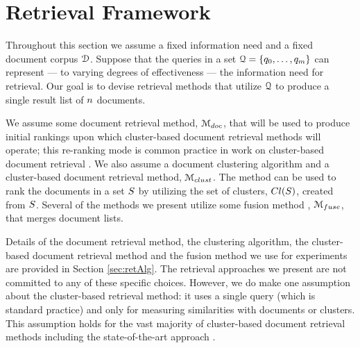 \section{Retrieval Framework}
Throughout this section we assume a fixed information need and a fixed document corpus ${\mathcal D}$. Suppose that the queries in a set 
${\mathcal Q}=\{q_0,\ldots,q_{m}\}$ can represent --- to varying degrees of effectiveness
--- the information need for retrieval. Our goal is to devise retrieval methods that
utilize ${\mathcal Q}$ to produce a single result list of $n$ documents. 

We assume some document retrieval
method, ${\mathcal M_{doc}}$, that will be used to produce initial rankings
upon which cluster-based document retrieval methods will operate; this re-ranking mode is common practice in work on cluster-based document retrieval 
\cite{Kurland+Lee:06a,Liu+Croft:06a,Liu+Croft:06b,Liu+Croft:08a,kurland:08a,Kurland+Krikon:11a,Raiber+Kurland:13a}. We also assume a document clustering algorithm and a cluster-based
  document retrieval method, $\mathcal M_{clust}$. The method can be used
  to rank the documents in a set $S$ by utilizing
  the set of clusters, $Cl(S)$, created from
  $S$. Several of the methods we present utilize some
  fusion method \cite{Croft:00b}, ${\mathcal M_{fuse}}$, that merges document lists. 

  Details of the document retrieval method, the clustering algorithm,
  the cluster-based document retrieval method and the fusion method we
  use for experiments are provided in Section \ref{sec:retAlg}. The
  retrieval approaches we present are not committed to any of these
  specific choices. However, we do make one assumption about the cluster-based
  retrieval method: it uses a single query (which is standard
  practice) and only for measuring similarities with documents or clusters. This assumption holds for the vast majority of cluster-based document
  retrieval methods \cite{Kurland+Lee:04a,Liu+Croft:04a,Kurland+Lee:06a,Liu+Croft:06a,Liu+Croft:06b,Kurland+Domshlak:08a,Kurland:09a,Kurland+Krikon:11a,Raiber+Kurland:13a} including the
  state-of-the-art approach \cite{Raiber+Kurland:13a}.


